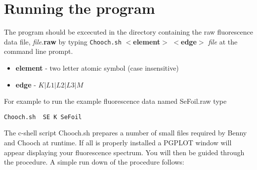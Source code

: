 \documentclass[a4]{article}
\begin{document}
\section{Running the program}

The program should be excecuted in the directory containing the raw
fluorescence data file, {\it file}.{\bf raw} by typing {\tt Chooch.sh}
$<${\bf element}$>$ $<${\bf edge}$>$ {\it file} at the command line prompt. 
\begin{itemize}
\item {\bf element} - two letter atomic symbol (case insensitive)
\item {\bf edge}  - $K | L1 | L2 | L3 | M$
\end{itemize}

For example to run the example fluorescence data named SeFoil.raw type
\begin{verbatim}
Chooch.sh  SE K SeFoil
\end{verbatim}

The c-shell script Chooch.sh prepares a number of small files required by Benny and Chooch
at runtime. If all is properly installed a PGPLOT window will appear displaying
your fluorescence spectrum. You will then be guided through the procedure.
A simple run down of the procedure follows:
\end{document}
